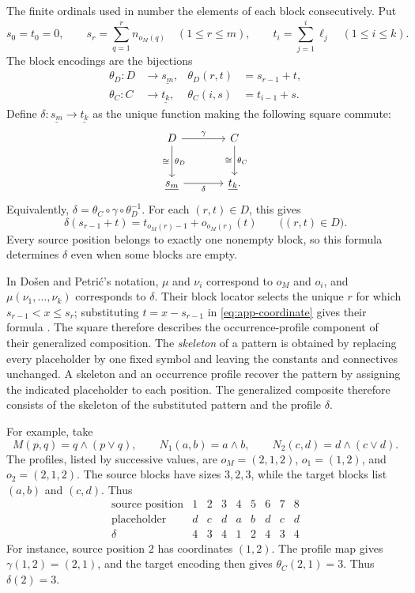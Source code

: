 \documentclass[11pt]{article}
\begin{document}
The finite ordinals used in \cite{DP} number the elements of each
block consecutively. Put
\[
 s_0=t_0=0,\qquad
 s_r=\sum_{q=1}^{r}n_{o_M(q)}\quad(1\leq r\leq m),\qquad
 t_i=\sum_{j=1}^{i}\ell_j\quad(1\leq i\leq k).
\]
The block encodings are the bijections
\[
 \begin{aligned}
 \theta_D:D&\longrightarrow\underline{s_m},
       &\theta_D(r,t)&=s_{r-1}+t,\\
 \theta_C:C&\longrightarrow\underline{t_k},
       &\theta_C(i,s)&=t_{i-1}+s.
 \end{aligned}
\]
Define $\delta:\underline{s_m}\to\underline{t_k}$ as the unique
function making the following square commute:
\begin{equation}\label{eq:app-ordinal}
\begin{tikzcd}[column sep=large,row sep=large]
 D\arrow[r,"\gamma"]\arrow[d,"\theta_D","\cong"']
    &C\arrow[d,"\theta_C","\cong"']\\
 \underline{s_m}\arrow[r,"\delta"']&\underline{t_k}.
\end{tikzcd}
\end{equation}
Equivalently, $\delta=\theta_C\circ\gamma\circ\theta_D^{-1}$.
For each $(r,t)\in D$, this gives
\begin{equation}\label{eq:app-coordinate}
 \delta(s_{r-1}+t)=t_{o_M(r)-1}+o_{o_M(r)}(t)
 \qquad\bigl((r,t)\in D\bigr).
\end{equation}
Every source position belongs to exactly one nonempty block, so this
formula determines $\delta$ even when some blocks are empty.

In Do\v{s}en and Petri\'c's notation, $\mu$ and $\nu_i$ correspond to
$o_M$ and $o_i$, and $\mu(\nu_1,\ldots,\nu_k)$ corresponds to $\delta$.
Their block locator selects the unique $r$ for which
$s_{r-1}<x\leq s_r$; substituting $t=x-s_{r-1}$ in
\eqref{eq:app-coordinate} gives their formula
\cite[\S2.5, p.~46]{DP}. The square therefore describes the
occurrence-profile component of their generalized composition.
The \emph{skeleton} of a pattern is obtained by replacing every
placeholder by one fixed symbol and leaving the constants and
connectives unchanged. A skeleton and an occurrence profile recover
the pattern by assigning the indicated placeholder to each position.
The generalized composite therefore consists of the skeleton of the
substituted pattern and the profile $\delta$.

For example, take
\[
 M(p,q)=q\wedge(p\vee q),\qquad
 N_1(a,b)=a\wedge b,\qquad
 N_2(c,d)=d\wedge(c\vee d).
\]
The profiles, listed by successive values, are
$o_M=(2,1,2)$, $o_1=(1,2)$, and $o_2=(2,1,2)$.
The source blocks have sizes $3,2,3$, while the target blocks list
$(a,b)$ and $(c,d)$. Thus
\[
\begin{array}{c|ccc|cc|ccc}
 \text{source position}&1&2&3&4&5&6&7&8\\\hline
 \text{placeholder}&d&c&d&a&b&d&c&d\\
 \delta&4&3&4&1&2&4&3&4
\end{array}
\]
For instance, source position $2$ has coordinates $(1,2)$.
The profile map gives $\gamma(1,2)=(2,1)$, and the target encoding
then gives $\theta_C(2,1)=3$. Thus $\delta(2)=3$.
\end{document}
